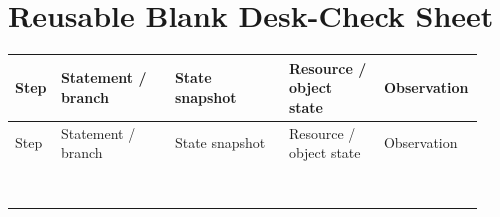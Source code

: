 \documentclass[10pt]{article}
\newcommand{\fieldline}[1]{\textbf{#1}\hspace{0.5em}\leaders\hbox{\rule[0.4ex]{0.6em}{0.35pt}\hspace{0.25em}}\hfill\kern0pt}
\begin{document}
\section{Reusable Blank Desk-Check Sheet}
\begin{longtable}{@{}C{0.06\linewidth}L{0.24\linewidth}L{0.24\linewidth}L{0.20\linewidth}L{0.19\linewidth}@{}}
\toprule
Step & Statement / branch & State snapshot & Resource / object state & Observation \\
\midrule
\endfirsthead
\toprule
Step & Statement / branch & State snapshot & Resource / object state & Observation \\
\midrule
\endhead
\rule{0pt}{2.8em} & & & & \\
\rule{0pt}{2.8em} & & & & \\
\rule{0pt}{2.8em} & & & & \\
\rule{0pt}{2.8em} & & & & \\
\rule{0pt}{2.8em} & & & & \\
\rule{0pt}{2.8em} & & & & \\
\rule{0pt}{2.8em} & & & & \\
\rule{0pt}{2.8em} & & & & \\
\bottomrule
\end{longtable}
\end{document}
